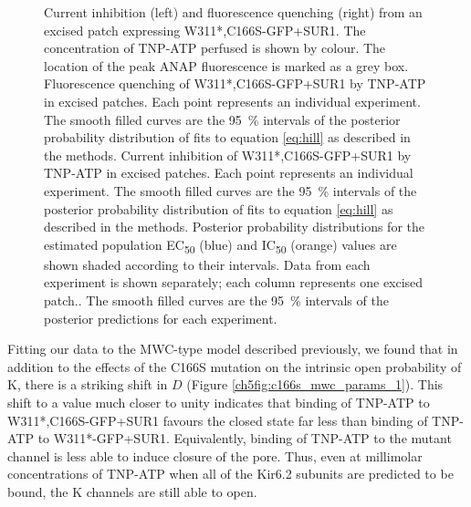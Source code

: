 \begin{figure}[h]
	\caption[C166S alters sensitivity to nucleotide inhibition]{
	 Current inhibition (left) and fluorescence quenching (right) from an excised patch expressing W311*,C166S-GFP+SUR1.
	The concentration of TNP-ATP perfused is shown by colour.
	The location of the peak ANAP fluorescence is marked as a grey box.
	 Fluorescence quenching of W311*,C166S-GFP+SUR1 by TNP-ATP in excised patches.
	Each point represents an individual experiment.
	The smooth filled curves are the \SI{95}{\percent} intervals of the posterior probability distribution of fits to equation \ref{eq:hill} as described in the methods.
	 Current inhibition of W311*,C166S-GFP+SUR1 by TNP-ATP in excised patches.
	Each point represents an individual experiment.
	The smooth filled curves are the \SI{95}{\percent} intervals of the posterior probability distribution of fits to equation \ref{eq:hill} as described in the methods.
	 Posterior probability distributions for the estimated population EC\textsubscript{50} (blue) and IC\textsubscript{50} (orange) values are shown shaded according to their intervals.
	 Data from each experiment is shown separately; each column represents one excised patch..
	The smooth filled curves are the \SI{95}{\percent} intervals of the posterior predictions for each experiment.
	}\label{ch5fig:c166s_2}
\end{figure}

Fitting our data to the MWC-type model described previously, we found that in addition to the effects of the C166S mutation on the intrinsic open probability of K\ATP{}, there is a striking shift in $D$ (Figure \ref{ch5fig:c166s_mwc_params_1}).
This shift to a value much closer to unity indicates that binding of TNP-ATP to W311*,C166S-GFP+SUR1 favours the closed state far less than binding of TNP-ATP to W311*-GFP+SUR1.
Equivalently, binding of TNP-ATP to the mutant channel is less able to induce closure of the pore.
Thus, even at millimolar concentrations of TNP-ATP when all of the Kir6.2 subunits are predicted to be bound, the K\ATP{} channels are still able to open.

